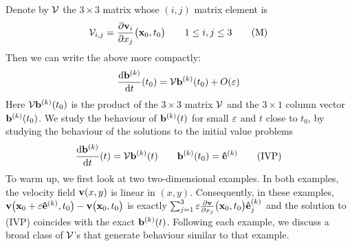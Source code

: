 Denote by $\mathcal{V}$ the $3\times 3$ matrix whose $(i,j)$ matrix element is
\begin{equation}
\mathcal{V}_{i,j}=\frac{\partial \mathbf{v}_i}{\partial x_j}\big(\mathbf{x}_0,t_0\big)
\qquad 1\le i,j\le 3
\tag{M}\end{equation}
Then we can write the above more compactly:
\begin{equation*}
\diff{\vb^{(k)}}{t}(t_0)=\cV\vb^{(k)}(t_0)+O(\veps)
\end{equation*}
Here $\mathcal{V}\mathbf{b}^{(k)}(t_0)$ is the product of the $3\times 3$ matrix $\mathcal{V}$ and the $3\times 1$ column vector $\mathbf{b}^{(k)}(t_0)$. 
We study the behaviour of $\mathbf{b}^{(k)}(t)$ for small $\varepsilon$  and $t$ close to
$t_0$, by studying the behaviour of the solutions to the initial value problems
\begin{equation}
\diff{\vb^{(k)}}{t}(t)=\cV\vb^{(k)}(t)\qquad \vb^{(k)}(t_0)=\ha{k}
\tag{IVP}\end{equation}
To warm up, we first look at two two-dimensional examples. In both 
examples, the velocity field $\mathbf{v}(x,y)$ is linear in $(x,y)$. 
Consequently, in these examples, $\mathbf{v}\big(\mathbf{x}_0+\varepsilon\mathbf{\hat e}^{(k)},t_0\big)-\mathbf{v}\big(\mathbf{x}_0,t_0\big)$
is exactly $\mathop{{\textstyle \sum}}_{j=1}^3\varepsilon\frac{\partial\mathbf{v}}
{\partial x_j}\big(\mathbf{x}_0,t_0\big)\mathbf{\hat e}^{(k)}_j$ and 
 the solution to (IVP) coincides with the exact $\mathbf{b}^{(k)}(t)$.
Following each example, we discuss a broad class of $\mathcal{V}$'s that generate  
behaviour similar to that example. 


